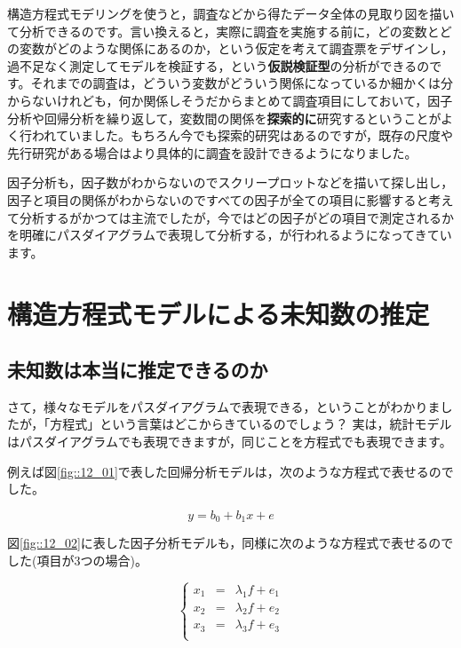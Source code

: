 \documentclass{ltjsbook}
\begin{document}
構造方程式モデリングを使うと，調査などから得たデータ全体の見取り図を描いて分析できるのです。言い換えると，実際に調査を実施する前に，どの変数とどの変数がどのような関係にあるのか，という仮定を考えて調査票をデザインし，過不足なく測定してモデルを検証する，という\textbf{仮説検証型}の分析ができるのです。それまでの調査は，どういう変数がどういう関係になっているか細かくは分からないけれども，何か関係しそうだからまとめて調査項目にしておいて，因子分析や回帰分析を繰り返して，変数間の関係を\textbf{探索的に}研究するということがよく行われていました。もちろん今でも探索的研究はあるのですが，既存の尺度や先行研究がある場合はより具体的に調査を設計できるようになりました。

因子分析も，因子数がわからないのでスクリープロットなどを描いて探し出し，因子と項目の関係がわからないのですべての因子が全ての項目に影響すると考えて分析するがかつては主流でしたが，今ではどの因子がどの項目で測定されるかを明確にパスダイアグラムで表現して分析する，が行われるようになってきています。



\section{構造方程式モデルによる未知数の推定}
\subsection{未知数は本当に推定できるのか}
さて，様々なモデルをパスダイアグラムで表現できる，ということがわかりましたが，「方程式」という言葉はどこからきているのでしょう？ 
実は，統計モデルはパスダイアグラムでも表現できますが，同じことを方程式でも表現できます。

例えば図\ref{fig::12_01}で表した回帰分析モデルは，次のような方程式で表せるのでした。

\[ y = b_0 + b_1 x + e \]

図\ref{fig::12_02}に表した因子分析モデルも，同様に次のような方程式で表せるのでした(項目が3つの場合)。

\[ \left \{
    \begin{array}{rcl}
        x_1 &=& \lambda_1 f + e_1\\
        x_2 &=& \lambda_2 f + e_2\\
        x_3 &=& \lambda_3 f + e_3\\
    \end{array}
    \right .
\]
\end{document}
